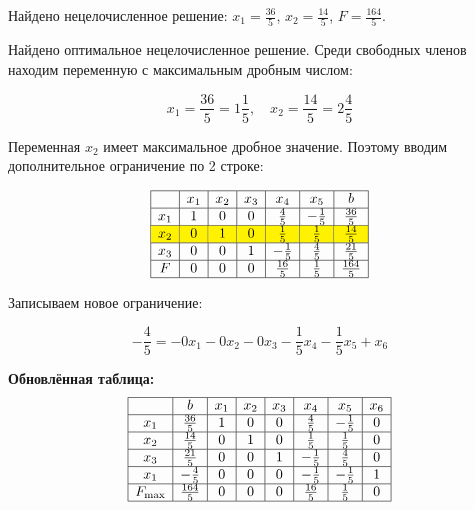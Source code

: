 \documentclass{article}
\begin{document}
Найдено нецелочисленное решение: \(x_1 = \frac{36}{5}\), \(x_2 = \frac{14}{5}\), \(F = \frac{164}{5}\).

Найдено оптимальное нецелочисленное решение. Среди свободных членов находим переменную с максимальным дробным числом:

\[
    x_1 = \frac{36}{5} = 1\frac{1}{5}, \quad x_2 = \frac{14}{5} = 2\frac{4}{5}
\]

Переменная \(x_2\) имеет максимальное дробное значение. Поэтому вводим дополнительное ограничение по 2 строке:

\[
    \begin{array}{|c|c|c|c|c|c|c|}
        \hline
            & x_1 & x_2 & x_3 & x_4          & x_5          & b             \\ \hline
        x_1 & 1   & 0   & 0   & \frac{4}{5}  & -\frac{1}{5} & \frac{36}{5}  \\ \hline
        \rowcolor{yellow}
        x_2 & 0   & 1   & 0   & \frac{1}{5}  & \frac{1}{5}  & \frac{14}{5}  \\ \hline
        x_3 & 0   & 0   & 1   & -\frac{1}{5} & \frac{4}{5}  & \frac{21}{5}  \\ \hline
        F   & 0   & 0   & 0   & \frac{16}{5} & \frac{1}{5}  & \frac{164}{5} \\ \hline
    \end{array}
\]

Записываем новое ограничение:

\[
    -\frac{4}{5} = -0x_1 - 0x_2 - 0x_3 - \frac{1}{5}x_4 - \frac{1}{5}x_5 + x_6
\]

\textbf{Обновлённая таблица:}
\[
    \begin{array}{|c|c|c|c|c|c|c|c|}
        \hline
                 & b             & x_1 & x_2 & x_3 & x_4          & x_5          & x_6 \\ \hline
        x_1      & \frac{36}{5}  & 1   & 0   & 0   & \frac{4}{5}  & -\frac{1}{5} & 0   \\ \hline
        x_2      & \frac{14}{5}  & 0   & 1   & 0   & \frac{1}{5}  & \frac{1}{5}  & 0   \\ \hline
        x_3      & \frac{21}{5}  & 0   & 0   & 1   & -\frac{1}{5} & \frac{4}{5}  & 0   \\ \hline
        x_1      & -\frac{4}{5}  & 0   & 0   & 0   & -\frac{1}{5} & -\frac{1}{5} & 1   \\ \hline
        F_{\max} & \frac{164}{5} & 0   & 0   & 0   & \frac{16}{5} & \frac{1}{5}  & 0   \\ \hline
    \end{array}
\]
\end{document}
